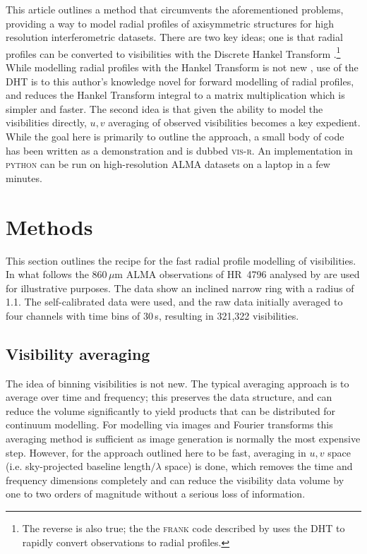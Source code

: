 \documentclass[fleqn,usenatbib]{mnras}
\begin{document}
This article outlines a method that circumvents the aforementioned problems, providing a way to model radial profiles of axisymmetric structures for high resolution interferometric datasets. There are two key ideas; one is that radial profiles can be converted to visibilities with the Discrete Hankel Transform \citep[DHT,][]{2015JOSAA..32..611B}.\footnote{The reverse is also true; the the \textsc{frank} code described by \citet{2020MNRAS.tmp.1491J} uses the DHT to rapidly convert observations to radial profiles.}  While modelling radial profiles with the Hankel Transform is not new \citep[e.g.][]{2018ApJ...869L..48G}, use of the DHT is to this author's knowledge novel for forward modelling of radial profiles, and reduces the Hankel Transform integral to a matrix multiplication which is simpler and faster. The second idea is that given the ability to model the visibilities directly, $u,v$ averaging of observed visibilities becomes a key expedient. While the goal here is primarily to outline the approach, a small body of code has been written as a demonstration and is dubbed \textsc{vis-r}. An implementation in \textsc{python} can be run on high-resolution ALMA datasets on a laptop in a few minutes.

\section{Methods}

This section outlines the recipe for the fast radial profile modelling of visibilities. In what follows the 860\,$\mu$m ALMA observations of HR~4796 analysed by \citet{2018MNRAS.475.4924K} are used for illustrative purposes. The data show an inclined narrow ring with a radius of 1.1\arcsec. The self-calibrated data were used, and the raw data initially averaged to four channels with time bins of 30\,s, resulting in 321,322 visibilities.

\subsection{Visibility averaging}\label{sec:avg}

The idea of binning visibilities is not new. The typical averaging approach is to average over time and frequency; this preserves the data structure, and can reduce the volume significantly to yield products that can be distributed for continuum modelling. For modelling via images and Fourier transforms this averaging method is sufficient as image generation is normally the most expensive step. However, for the approach outlined here to be fast, averaging in $u,v$ space (i.e. sky-projected baseline length$/\lambda$ space) is done, which removes the time and frequency dimensions completely and can reduce the visibility data volume by one to two orders of magnitude without a serious loss of information.
\end{document}
